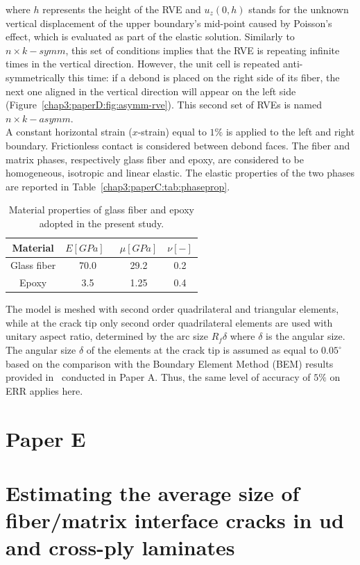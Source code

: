where $h$ represents the height of the RVE and $u_{z}\left(0,h\right)$ stands for the unknown vertical displacement of the upper boundary's mid-point caused by Poisson's effect, which is evaluated as part of the elastic solution. Similarly to $n\times k-symm$, this set of conditions implies that the RVE is repeating infinite times in the vertical direction. However, the unit cell is repeated anti-symmetrically this time: if a debond is placed on the right side of its fiber, the next one aligned in the vertical direction will appear on the left side (Figure~\ref{chap3:paperD:fig:asymm-rve}). This second set of RVEs is named $n\times k-asymm$.\\
A constant horizontal strain ($x$-strain) equal to $1\%$ is applied to the left and right boundary. Frictionless contact is considered between debond faces. The fiber and matrix phases, respectively glass fiber and epoxy, are considered to be homogeneous, isotropic and linear elastic. The elastic properties of the two phases are reported in Table~\ref{chap3:paperC:tab:phaseprop}.

\begin{table}[!h]
 \centering
 \caption{Material properties of glass fiber and epoxy adopted in the present study.}
 \begin{tabular}{cccc}
\\
\textbf{Material} & \textbf{$E\left[GPa\right]$}\ & \textbf{$\mu\left[GPa\right]$} & \textbf{$\nu\left[-\right]$} \\
\midrule
Glass fiber    & 70.0  & 29.2   & 0.2  \\
Epoxy    & 3.5    & 1.25   & 0.4
\end{tabular}
\label{chap3:paperD:tab:phaseprop}
\end{table}

The model is meshed with second order quadrilateral and triangular elements, while at the crack tip only second order quadrilateral elements are used with unitary aspect ratio, determined by the arc size $R_{f}\delta$ where $\delta$ is the angular size. The angular size $\delta$ of the elements at the crack tip is assumed as equal to $0.05^{\circ}$ based on the comparison with the Boundary Element Method (BEM) results provided in~\cite{Paris2007,Sandino2016} conducted in Paper A. Thus, the same level of accuracy of $5\%$ on ERR applies here.

\section{Paper E}
\section*{Estimating the average size of fiber/matrix interface cracks in ud and cross-ply laminates}
